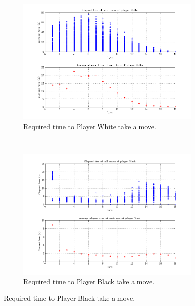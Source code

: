 \begin{figure}[h]
        \centering
        \begin{subfigure}[b]{0.5\textwidth}
                \includegraphics[width=\textwidth]{images/PENTAGOtimes}
                \caption{Required time to Player White take a move.}
                \label{fig:time_white}
        \end{subfigure}%
        ~ %
        \begin{subfigure}[b]{0.5\textwidth}
                \includegraphics[width=\textwidth]{images/LBtimes}
                \caption{Required time to Player Black take a move.}
                \label{fig:time_black}
        \end{subfigure}

\end{figure}

